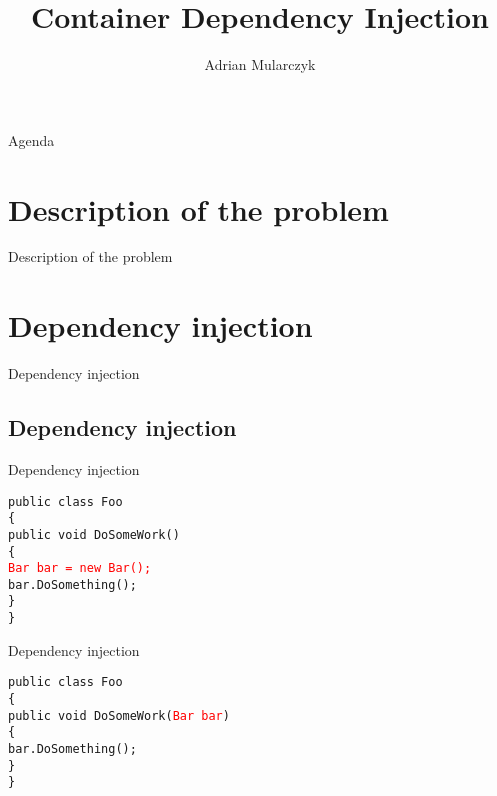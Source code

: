 \documentclass{beamer}
\title[]
{Container Dependency Injection}
\author[Adrian Mularczyk]{Adrian Mularczyk}
\date{}
\newcommand{\code}[1]{{\texttt{#1}}}
\begin{document}
\begin{frame}
  \titlepage 
\end{frame}

\begin{frame}{Agenda}
  \tableofcontents
\end{frame}

\section{Description of the problem}

\begin{frame}{}
	\begin{center}
		\Huge{Description of the problem}
	\end{center}
\end{frame}

\section{Dependency injection}

\begin{frame}{}
	\begin{center}
		\Huge{Dependency injection}
	\end{center}
\end{frame}

\subsection*{Dependency injection}

\begin{frame}{Dependency injection}
     \begin{large}
	\code{public class Foo}\\
	\code{\{}\\ \quad
		\code{public void DoSomeWork()}\\ \quad
		\code{\{}\\ \qquad
		\code{\textcolor{red}{Bar bar = new Bar();}}\\ \qquad
		\code{bar.DoSomething();}\\ \quad
		\code{\}}\\
	\code{\}}
     \end{large}
\end{frame}

\begin{frame}{Dependency injection}
     \begin{large}
	\code{public class Foo}\\
	\code{\{}\\ \quad
		\code{public void DoSomeWork(\textcolor{red}{Bar bar})}\\ \quad
		\code{\{}\\ \qquad
		\code{bar.DoSomething();}\\ \quad
		\code{\}}\\
	\code{\}}
     \end{large}
\end{frame}
\end{document}
